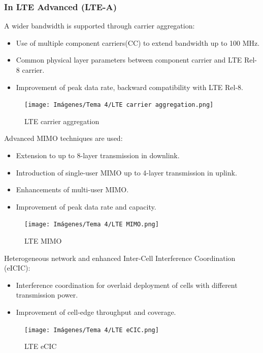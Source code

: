 \documentclass[
	12pt,
	twoside
]{book}
\begin{document}
\subsubsection{In LTE Advanced (LTE-A)}

A wider bandwidth is supported through carrier aggregation:
\begin{itemize}
	\item Use of multiple component carriers(CC) to extend bandwidth up to 100 MHz.
	\item Common physical layer parameters between component carrier and LTE Rel-8 carrier.
	\item Improvement of peak data rate, backward compatibility with LTE Rel-8.
\end{itemize}

\begin{figure}[H]
	\centering
	\texttt{[image: Imágenes/Tema 4/LTE carrier aggregation.png]}
	\caption{
		\label{fig:unit4_LTE_carrier_aggregation}
		LTE carrier aggregation
	}
\end{figure}

Advanced MIMO techniques are used:
\begin{itemize}
	\item Extension to up to 8-layer transmission in downlink.
	\item Introduction of single-user MIMO up to 4-layer transmission in uplink.
	\item Enhancements of multi-user MIMO.
	\item Improvement of peak data rate and capacity.
\end{itemize}

\begin{figure}[H]
	\centering
	\texttt{[image: Imágenes/Tema 4/LTE MIMO.png]}
	\caption{
		\label{fig:unit4_LTE_MIMO}
		LTE MIMO
	}
\end{figure}

Heterogeneous network and enhanced Inter-Cell Interference Coordination (eICIC):
\begin{itemize}
	\item Interference coordination for overlaid deployment of cells with different transmission power.
	\item Improvement of cell-edge throughput and coverage.
\end{itemize}

\begin{figure}[H]
	\centering
	\texttt{[image: Imágenes/Tema 4/LTE eCIC.png]}
	\caption{
		\label{fig:unit4_LTE_eCIC}
		LTE eCIC
	}
\end{figure}
\end{document}
